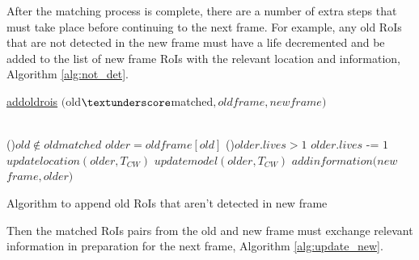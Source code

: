 \documentclass[11pt,twoside]{report}
\begin{document}
After the matching process is complete, there are a number of extra steps that must take place before continuing to the next frame. For example, any old RoIs that are not detected in the new frame must have a life decremented and be added to the list of new frame RoIs with the relevant location and information, Algorithm \ref{alg:not_det}. \newline

\begin{algorithm}[H]
	\DontPrintSemicolon
	\SetAlgoLined
	\underline{add\textunderscore old\textunderscore rois} $($old$\textunderscore$matched$,old$\textunderscore$frame,new$\textunderscore$frame)$\;
	
	\texttt{\\}
	\ForEach(){$old \notin old$\textunderscore$matched$}{
		$older = old$\textunderscore$frame[old]$ 
		\uIf(){$older.lives > 1$}{
			$older.lives$ -= $1$ 
			$update$\textunderscore$location(older,T_{CW})$  
			$update$\textunderscore$model(older,T_{CW})$  
			$add$\textunderscore$information(new$\textunderscore$frame,older)$  
		}
	}
	\texttt{\\}
	\caption{Algorithm to append old RoIs that aren't detected in new frame}
	\label{alg:not_det}
\end{algorithm}

\newpage

Then the matched RoIs pairs from the old and new frame must exchange relevant information in preparation for the next frame, Algorithm \ref{alg:update_new}.
\end{document}
